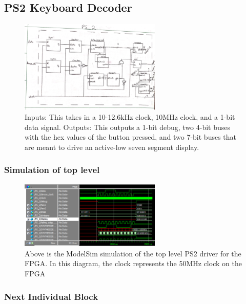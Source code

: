 \documentclass[a4paper]{article}
\begin{document}
\subsection{PS2 Keyboard Decoder}

\begin{figure}[H]
  \centering
    \includegraphics[width=0.6\textwidth,angle=90,origin=c]{images/block_diagrams/PS2/PS2Top.jpg}
	\caption{Inputs: This takes in a 10-12.6kHz clock, 10MHz clock, and a 1-bit data signal. \newline
	Outputs: This outputs a 1-bit debug, two 4-bit buses with the hex values of the button pressed, and two 7-bit buses that are meant to drive  an active-low seven segment display. \newline}
	\label{fig:PS2_decoder}
\end{figure}

\subsubsection{Simulation of top level}

\begin{figure}[H]
  \centering
    \includegraphics[width=0.6\textwidth]{images/ModelSim/PS2/PS2_Controller.png}
	\caption{Above is the ModelSim simulation of the top level PS2 driver for the FPGA. In this diagram, the clock represents the 50MHz clock on the FPGA}
	\label{fig:PS2_topsim}
\end{figure}
\subsubsection{Next Individual Block}
\end{document}
